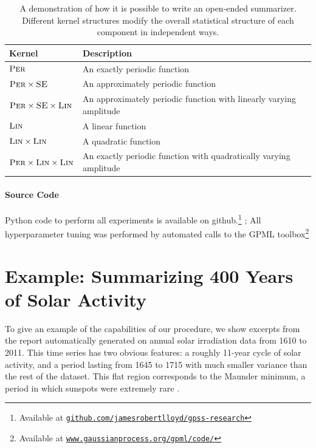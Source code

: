 \documentclass{article} %
\begin{document}
\begin{table}[ht]
\begin{tabular}{l|l}
Kernel & Description \\
\midrule
${\textsc{Per}}$ & An exactly periodic function \\
${\textsc{Per}} \times {\textsc{SE}}$ & An approximately periodic function \\
${\textsc{Per}} \times {\textsc{SE}} \times {\textsc{Lin}}$ & An approximately periodic function with linearly varying amplitude \\
${\textsc{Lin}}$ & A linear function \\
${\textsc{Lin}} \times {\textsc{Lin}}$ & A quadratic function \\
${\textsc{Per}} \times {\textsc{Lin}} \times {\textsc{Lin}}$ & An exactly periodic function with quadratically varying amplitude\\
\end{tabular}
\caption{A demonstration of how it is possible to write an open-ended summarizer.  Different kernel structures modify the overall statistical structure of each component in independent ways.}
\label{table:descriptions}
\end{table}

\paragraph{Source Code}
Python code to perform all experiments is available on github.\footnote{Available at 
\href{http://www.github.com/jamesrobertlloyd/gpss-research}
{\texttt{github.com/jamesrobertlloyd/gpss-research}}} ; 
All \gp{} hyperparameter tuning was performed by automated calls to the GPML toolbox\footnote{Available at 
\href{http://www.gaussianprocess.org/gpml/code/}
{\texttt{www.gaussianprocess.org/gpml/code/}}
}

\section{Example: Summarizing 400 Years of Solar Activity}
\label{sec:example}

To give an example of the capabilities of our procedure, we show excerpts from the report automatically generated on annual solar irradiation data from 1610 to 2011.  This time series has two obvious features: a roughly 11-year cycle of solar activity, and a period lasting from 1645 to 1715 with much smaller variance than the rest of the dataset.  This flat region corresponds to the Maunder minimum, a period in which sunspots were extremely rare \citep{lean1995reconstruction}.
\end{document}
